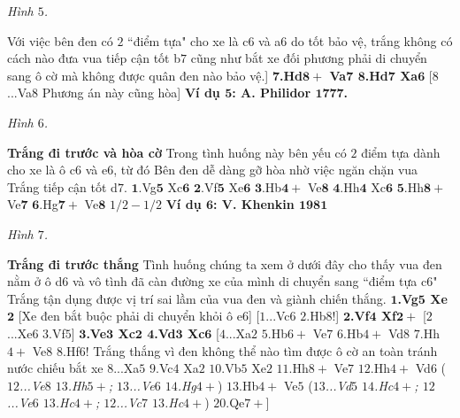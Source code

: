 \begin{multicols}{2}
	\begin{center}
		\newgame
		\scalebox{0.85}\showboard
		\vskip 0.1cm
		\textit{\small\color{gocco}Hình $5$.}
		\vspace*{-5pt}
	\end{center}
	Với việc bên đen có $2$ ``điểm tựa"  cho xe là c$6$ và a$6$ do tốt bảo vệ, trắng không có cách nào đưa vua tiếp cận tốt b$7$ cũng như bắt xe đối phương phải di chuyển sang ô cờ mà không được quân đen nào bảo vệ.]
	\vskip 0.1cm
	$\pmb{7}$\textbf{\color{gocco}.Hd$\pmb{8+}$ Va$\pmb{7}$ $\pmb{8}$.Hd$\pmb{7}$ Xa}$\pmb{6}$ [$8$...Va$8$ Phương án này cũng hòa]
	\vskip 0.1cm
	\textbf{\color{gocco}Ví dụ $\pmb{5}$: A.	Philidor $\pmb{1777}$.}
	\begin{center}
		\newgame
		\scalebox{0.8}\showboard
		\vskip 0.1cm
		\textit{\small\color{gocco}Hình $6$.}
		\vspace*{-5pt}
	\end{center}
	\textbf{\color{gocco}Trắng đi trước và hòa cờ}
	\vskip 0.1cm
	Trong tình huống này bên yếu có $2$ điểm tựa dành cho xe là ô c$6$ và e$6$, từ đó Bên đen dễ dàng gỡ hòa nhờ việc ngăn chặn vua Trắng tiếp cận tốt d$7$.
	\vskip 0.1cm
	$\pmb{1}$.Vg$\pmb{5}$ Xc$\pmb{6}$ $\pmb{2}$.Vf$\pmb{5}$ Xe$\pmb{6}$ $\pmb{3}$.Hb$\pmb{4+}$ Ve$\pmb{8}$ $\pmb{4}$.Hh$\pmb{4}$ Xc$\pmb{6}$ $\pmb{5}$.Hh$\pmb{8+}$ Ve$\pmb{7}$ $\pmb{6}$.Hg$\pmb{7+}$ Ve$\pmb{8}$
	\vskip 0.1cm
	$1/2 - 1/2$
	\vskip 0.1cm
	\textbf{\color{gocco}Ví dụ $\pmb{6}$: V. Khenkin $\pmb{1981}$}
	\begin{center}
		\newgame
		\scalebox{0.8}\showboard
		\vskip 0.1cm
		\textit{\small\color{gocco}Hình $7$.}
		\vspace*{-5pt}
	\end{center}
	\textbf{\color{gocco}Trắng đi trước thắng}
	\vskip 0.1cm
	Tình huống chúng ta xem ở dưới đây cho thấy vua đen nằm ở ô d$6$ và vô tình đã càn đường xe của mình di chuyển sang ``điểm tựa c$6$"
	\vskip 0.1cm
	Trắng tận dụng được vị trí sai lầm của vua đen và giành chiến thắng.
	\vskip 0.1cm
	$\pmb{1}$\textbf{\color{gocco}.Vg$\pmb{5}$ Xe}$\pmb{2}$ [Xe đen bắt buộc phải di chuyển khỏi ô e$6$]
	\vskip 0.1cm
	[$1$...Vc$6$ $2$.Hb$8!$]
	\vskip 0.1cm
	$\pmb{2}$\textbf{\color{gocco}.Vf$\pmb{4}$ Xf}$\pmb{2+}$ [$2$...Xe$6$ $3$.Vf$5$]
	\vskip 0.1cm
	$\pmb{3}$\textbf{\color{gocco}.Ve$\pmb{3}$ Xc$\pmb{2}$ $\pmb{4}$.Vd$\pmb{3}$ Xc}$\pmb{6}$ [$4$...Xa$2$ $5$.Hb$6+$ Ve$7$ $6$.Hb$4+$ Vd$8$ $7$.Hh$4+$ Ve$8$ $8$.Hf$6!$ Trắng thắng vì đen không thể nào tìm được ô cờ an toàn tránh nước chiếu bắt xe $8$...Xa$5$ $9$.Vc$4$ Xa$2$ $10$.Vb$5$ Xe$2$ $11$.Hh$8+$ Ve$7$ $12$.Hh$4+$ Vd$6$ (\textit{$12$...Ve$8$ $13$.Hh$5+$; $13$...Ve$6$ $14$.Hg$4+$}) $13$.Hb$4+$ Ve$5$ (\textit{$13$...Vd$5$ $14$.Hc$4+$; $12$...Ve$6$ $13$.Hc$4+$; $12$...Vc$7$ $13$.Hc$4+$}) $20$.Qe$7+$]

\end{multicols}
